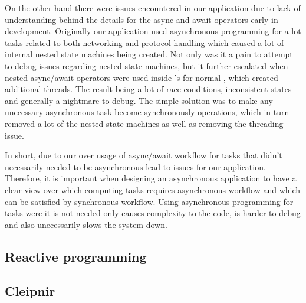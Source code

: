 On the other hand there were issues encountered in our application due to lack of understanding behind the details for the async and await operators early in development. Originally our application used asynchronous programming for a lot tasks related to both networking and protocol handling which caused a lot of internal nested state machines being created. Not only was it a pain to attempt to debug issues regarding nested state machines, but it further escalated when nested async/await operators were used inside 's for normal , which created additional threads. The result being a lot of race conditions, inconsistent states and generally a nightmare to debug. The simple solution was to make any unecessary asynchronous task become synchronously operations, which in turn removed a lot of the nested state machines as well as removing the  threading issue.

In short, due to our over usage of async/await workflow for tasks that didn't necessarily needed to be asynchronous lead to issues for our application. Therefore, it is important when designing an asynchronous application to have a clear view over which computing tasks requires asynchronous workflow and which can be satisfied by synchronous workflow. Using asynchronous programming for tasks were it is not needed only causes complexity to the code, is harder to debug and also unecessarily slows the system down.

\subsection{Reactive programming}


\subsection{Cleipnir}


